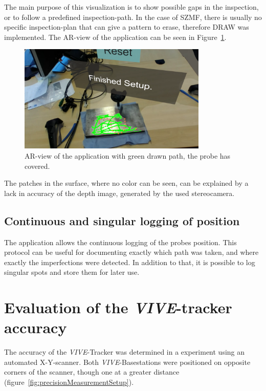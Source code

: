 \documentclass{VRARWorkshop}
\begin{document}
The main purpose of this visualization is to show possible gaps in the inspection, or to follow a predefined inspection-path.
In the case of SZMF, there is usually no specific inspection-plan that can give a pattern to erase, therefore {\sc DRAW} was implemented.
The AR-view of the application can be seen in Figure~\ref{fig:ARView}.

\begin{figure}[h!]
    \begin{center}
        \includegraphics[width=90mm]{images/AR-Screenshot}
        \caption{\label{fig:ARView} AR-view of the application with green drawn path, the probe has covered.}
    \end{center}
\end{figure}

The patches in the surface, where no color can be seen, can be explained by a lack in accuracy of the depth image, generated by the used stereocamera.

\subsection{Continuous and singular logging of position}
The application allows the continuous logging of the probes position.
This protocol can be useful for documenting exactly which path was taken, and where exactly the imperfections were detected.
In addition to that, it is possible to log singular spots and store them for later use.

\section{Evaluation of the \textit{VIVE}-tracker accuracy}
The accuracy of the \textit{VIVE}-Tracker was determined in a experiment using an automated X-Y-scanner.
Both \textit{VIVE}-Basestations were positioned on opposite corners of the scanner, though one at a greater distance (figure~\ref{fig:precisionMeasurementSetup}).
\end{document}
